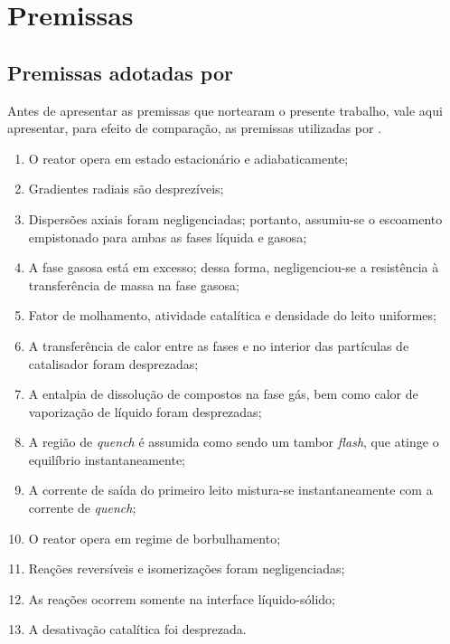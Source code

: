 
\section{Premissas} \label{sec:premissas}

\subsection{Premissas adotadas por }
\label{sec:premissasrojas}

Antes de apresentar as premissas que nortearam o presente trabalho, vale
aqui apresentar, para efeito de comparação, as premissas utilizadas por
.

\begin{enumerate}
  \item O reator opera em estado estacionário e adiabaticamente;
  \item Gradientes radiais são desprezíveis;
  \item Dispersões axiais foram negligenciadas; portanto, assumiu-se o
  escoamento empistonado para ambas as fases líquida e gasosa;
  \item A fase gasosa está em excesso; dessa forma, negligenciou-se a
  resistência à transferência de massa na fase gasosa;
  \item Fator de molhamento, atividade catalítica e densidade do leito
  uniformes;
  \item A transferência de calor entre as fases e no interior das partículas de
  catalisador foram desprezadas;
  \item A entalpia de dissolução de compostos na fase gás, bem como calor de
  vaporização de líquido foram desprezadas;
  \item A região de \emph{quench} é assumida como sendo um tambor \emph{flash},
  que atinge o equilíbrio instantaneamente;
  \item A corrente de saída do primeiro leito mistura-se instantaneamente com a
  corrente de \emph{quench};
  \item O reator opera em regime de borbulhamento;
  \item Reações reversíveis e isomerizações foram negligenciadas;
  \item As reações ocorrem somente na interface líquido-sólido;
  \item A desativação catalítica foi desprezada.
\end{enumerate}

